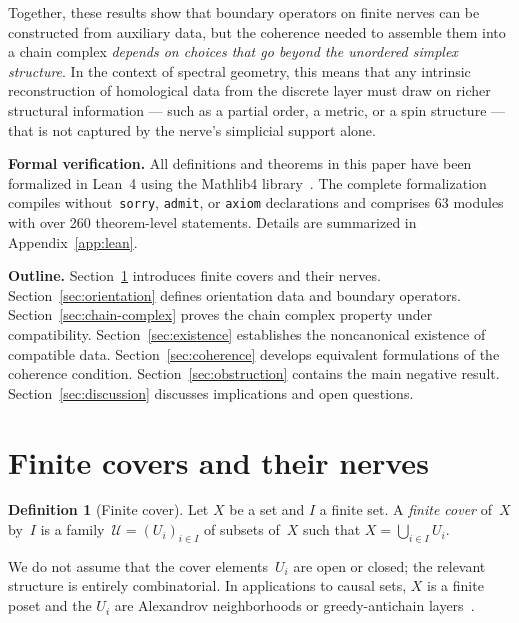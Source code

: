 \documentclass[11pt,a4paper]{article}
\theoremstyle{plain}
\theoremstyle{definition}
\newtheorem{definition}[theorem]{Definition}
\theoremstyle{remark}
\newcommand{\cU}{\mathcal{U}}
\begin{document}
\smallskip
Together, these results show that boundary operators on finite nerves can be
constructed from auxiliary data, but the coherence needed to assemble them
into a chain complex \emph{depends on choices that go beyond the unordered
simplex structure}. In the context of spectral geometry, this means that
any intrinsic reconstruction of homological data from the discrete layer
must draw on richer structural information --- such as a partial order,
a metric, or a spin structure --- that is not captured by the nerve's
simplicial support alone.

\medskip

\noindent\textbf{Formal verification.} All definitions and theorems in
this paper have been formalized in Lean~4 using the Mathlib4
library~\cite{Mathlib2024}. The complete formalization compiles
without~\texttt{sorry}, \texttt{admit}, or \texttt{axiom} declarations
and comprises 63 modules with over 260 theorem-level statements.
Details are summarized in Appendix~\ref{app:lean}.

\medskip

\noindent\textbf{Outline.}
Section~\ref{sec:nerve} introduces finite covers and their nerves.
Section~\ref{sec:orientation} defines orientation data and boundary operators.
Section~\ref{sec:chain-complex} proves the chain complex property under
compatibility.
Section~\ref{sec:existence} establishes the noncanonical existence of
compatible data.
Section~\ref{sec:coherence} develops equivalent formulations of the
coherence condition.
Section~\ref{sec:obstruction} contains the main negative result.
Section~\ref{sec:discussion} discusses implications and open questions.

\section{Finite covers and their nerves}
\label{sec:nerve}

\begin{definition}[Finite cover]
\label{def:cover}
Let $X$ be a set and $I$ a finite set. A \emph{finite cover} of~$X$ by~$I$
is a family~$\cU = (U_i)_{i \in I}$ of subsets of~$X$ such that
$X = \bigcup_{i \in I} U_i$.
\end{definition}

We do not assume that the cover elements~$U_i$ are open or closed;
the relevant structure is entirely combinatorial. In applications to
causal sets, $X$ is a finite poset and the $U_i$ are Alexandrov
neighborhoods or greedy-antichain layers~\cite{Sorkin:2003bx,Major:2007}.
\end{document}
